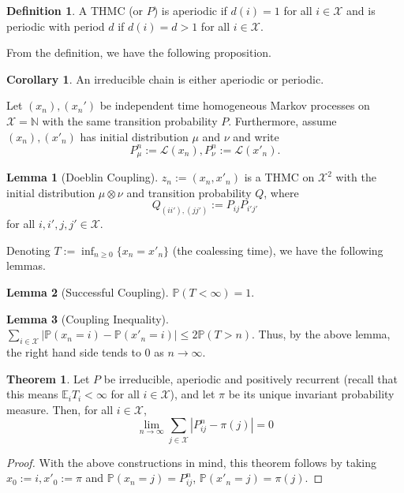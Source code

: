 \documentclass[]{article}
\theoremstyle{definition}
\newtheorem{theorem}{Theorem}
\newtheorem{corollary}{Corollary}[theorem]
\theoremstyle{definition}
\newtheorem{definition}{Definition}[section]
\newtheorem{lemma}{Lemma}[section]
\begin{document}
\begin{definition}
  A THMC (or \(P\)) is aperiodic if \(d(i) = 1\) for all \(i \in \mathcal{X}\) and 
  is periodic with period \(d\) if \(d(i) = d > 1\) for all \(i \in \mathcal{X}\).
\end{definition}

From the definition, we have the following proposition.

\begin{corollary}
  An irreducible chain is either aperiodic or periodic.
\end{corollary}

Let \((x_n), (x_n')\) be independent time homogeneous Markov processes
on \(\mathcal{X} = \mathbb{N}\) with the same transition probability \(P\). 
Furthermore, assume \((x_n), (x'_n)\) has initial distribution \(\mu\) and \(\nu\) 
and write 
\[P^n_\mu := \mathcal{L}(x_n), P^n_\nu := \mathcal{L}(x'_n).\]
\begin{lemma}[Doeblin Coupling]
  \(z_n := (x_n, x'_n)\) is a THMC on \(\mathcal{X}^2\) 
  with the initial distribution \(\mu \otimes \nu\) and transition probability 
  \(Q\), where 
  \[Q_{(ii'), (jj')} := P_{ij}P_{i'j'}\]
  for all \(i, i', j, j' \in \mathcal{X}\).
\end{lemma}

Denoting \(T := \inf_{n \ge 0} \{x_n = x'_n\}\) (the coalessing time), we have 
the following lemmas.

\begin{lemma}[Successful Coupling]
  \(\mathbb{P}(T < \infty) = 1\).
\end{lemma}

\begin{lemma}[Coupling Inequality]
  \(\sum_{i \in \mathcal{X}} |\mathbb{P}(x_n = i) - \mathbb{P}(x'_n = i)| \le 
  2\mathbb{P}(T > n)\). Thus, by the above lemma, the right hand side tends to 
  0 as \(n \to \infty\).
\end{lemma}

\begin{theorem}
  Let \(P\) be irreducible, aperiodic and positively recurrent (recall that this 
  means \(\mathbb{E}_i T_i < \infty\) for all \(i \in \mathcal{X}\)), and 
  let \(\pi\) be its unique invariant probability measure. Then, for all 
  \(i \in \mathcal{X}\),
  \[\lim_{n \to \infty} \sum_{j \in \mathcal{X}} |P^n_{ij} - \pi(j)| = 0\]
\end{theorem}
\begin{proof}
  With the above constructions in mind, this theorem follows by taking 
  \(x_0 := i, x'_0 := \pi\) and \(\mathbb{P}(x_n = j) = P^n_{ij}\), 
  \(\mathbb{P}(x'_n = j) = \pi(j)\).
\end{proof}
\end{document}

